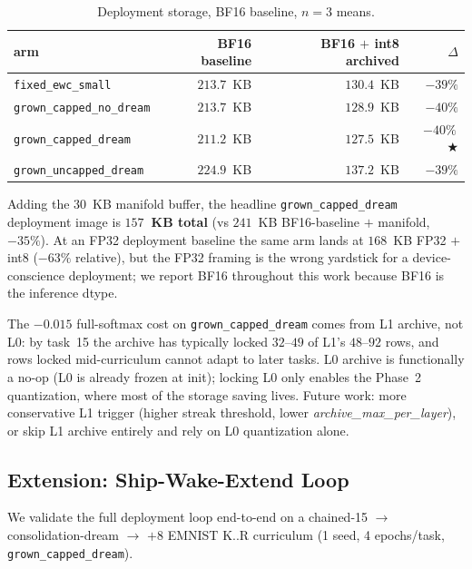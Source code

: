 \documentclass[11pt]{article}
\newcommand{\arm}[1]{\texttt{#1}}
\newcommand{\headline}{$\bigstar$}
\begin{document}
\begin{table}[h]
  \centering
  \caption{Deployment storage, BF16 baseline, $n = 3$ means.}
  \label{tab:archive-storage}
  \begin{tabular}{lrrr}
    \toprule
    arm                              & BF16 baseline & BF16 $+$ int8 archived & $\Delta$        \\
    \midrule
    \arm{fixed\_ewc\_small}          & $213.7$~KB    & $130.4$~KB             & $-39\%$         \\
    \arm{grown\_capped\_no\_dream}   & $213.7$~KB    & $128.9$~KB             & $-40\%$         \\
    \arm{grown\_capped\_dream}       & $211.2$~KB    & $127.5$~KB             & $-40\%$\,\headline \\
    \arm{grown\_uncapped\_dream}     & $224.9$~KB    & $137.2$~KB             & $-39\%$         \\
    \bottomrule
  \end{tabular}
\end{table}

Adding the 30~KB manifold buffer, the headline \arm{grown\_capped\_dream}
deployment image is \textbf{$157$~KB total} (vs $241$~KB BF16-baseline
$+$ manifold, $-35\%$). At an FP32 deployment baseline the same arm lands
at $168$~KB FP32 $+$ int8 ($-63\%$ relative), but the FP32 framing is the
wrong yardstick for a device-conscience deployment; we report BF16
throughout this work because BF16 is the inference dtype.

The $-0.015$ full-softmax cost on \arm{grown\_capped\_dream} comes from
L1 archive, not L0: by task~15 the archive has typically locked $32$--$49$
of L1's $48$--$92$ rows, and rows locked mid-curriculum cannot adapt to
later tasks. L0 archive is functionally a no-op (L0 is already frozen at
init); locking L0 only enables the Phase~2 quantization, where most of
the storage saving lives. Future work: more conservative L1 trigger
(higher streak threshold, lower \textit{archive\_max\_per\_layer}), or
skip L1 archive entirely and rely on L0 quantization alone.

\subsection{Extension: Ship-Wake-Extend Loop}
\label{sec:extension-results}

We validate the full deployment loop end-to-end on a chained-15 $\to$
consolidation-dream $\to$ $+8$ EMNIST K..R curriculum (1 seed, 4
epochs/task, \arm{grown\_capped\_dream}).
\end{document}
